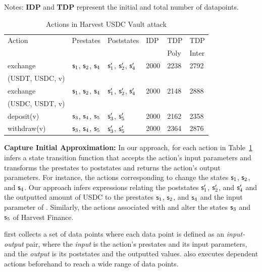 \begin{table}[!h]
    \caption{Actions in Harvest USDC Vault attack}
    
    Notes: \textbf{IDP} and \textbf{TDP} represent the initial and total number of datapoints.
    \label{table:prepost_harvest_usdc}
    \centering
    \begin{tabular}{|l|l|l|l|l|l|}
    \hline
    Action    & Prestates  & Poststates & IDP & TDP & TDP\\ 
              &            &  &  & Poly & Inter \\\hline
    exchange  & $\mathsf{s}_{1}$, $\mathsf{s}_{2}$, $\mathsf{s}_{4}$  & $\mathsf{s}_{1}'$, $\mathsf{s}_{2}'$, $\mathsf{s}_{4}'$  & 2000 & 2238 & 2792      \\ 
    (USDT, USDC, v) &   &  &  &  &  \\\hline
    exchange  & $\mathsf{s}_{1}$, $\mathsf{s}_{2}$, $\mathsf{s}_{4}$   & $\mathsf{s}_{1}'$, $\mathsf{s}_{2}'$, $\mathsf{s}_{4}'$    & 2000 & 2148 & 2888     \\ 
    (USDC, USDT, v) &  &  &  &  &      \\ \hline
    deposit(v)  & $\mathsf{s}_{3}$, $\mathsf{s}_{4}$, $\mathsf{s}_{5}$ & $\mathsf{s}_{3}'$, $\mathsf{s}_{5}'$    & 2000 & 2162 & 2358   \\ \hline
    withdraw(v)  & $\mathsf{s}_{3}$, $\mathsf{s}_{4}$, $\mathsf{s}_{5}$ & $\mathsf{s}_{3}'$, $\mathsf{s}_{5}'$   & 2000 & 2364 & 2876      \\ \hline
    \end{tabular}
\end{table}


\noindent \textbf{Capture Initial Approximation: } In our approach, for each action in Table~\ref{table:prepost_harvest_usdc} {\name} infers a state transition function that accepts the action's input parameters and transforms the prestates to poststates and returns the action's output parameters. For instance, the actions corresponding to  change the states $\mathsf{s}_{1}$, $\mathsf{s}_{2}$, and $\mathsf{s}_{4}$. Our approach infers expressions relating the poststates $\mathsf{s}_{1}'$, $\mathsf{s}_{2}'$, and $\mathsf{s}_{4}'$ and the outputted amount of USDC to the prestates $\mathsf{s}_{1}$, $\mathsf{s}_{2}$, and $\mathsf{s}_{4}$ and the input parameter of . 
Similarly, the actions associated with  and  alter the states $\mathsf{s}_{3}$ and $\mathsf{s}_{5}$ of Harvest Finance.

{\name} first collects a set of data points where each data point is defined as an \textit{input-output} pair, where the \textit{input} is the action's prestates and its input parameters, and the \textit{output} is its poststates and the outputted values. {\name} also executes dependent actions beforehand to reach a wide range of data points. 

